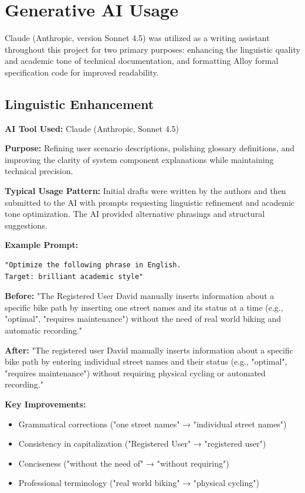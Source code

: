 \chapter{Generative AI Usage}
Claude (Anthropic, version Sonnet 4.5) was utilized as a writing assistant throughout this project for two primary purposes: enhancing the linguistic quality and academic tone of technical documentation, and formatting Alloy formal specification code for improved readability.

\section{Linguistic Enhancement}

\textbf{AI Tool Used:} Claude (Anthropic, Sonnet 4.5)

\textbf{Purpose:} Refining user scenario descriptions, polishing glossary definitions, and improving the clarity of system component explanations while maintaining technical precision.

\textbf{Typical Usage Pattern:} Initial drafts were written by the authors and then submitted to the AI with prompts requesting linguistic refinement and academic tone optimization. The AI provided alternative phrasings and structural suggestions.

\textbf{Example Prompt:}
\begin{verbatim}
"Optimize the following phrase in English. 
Target: brilliant academic style"
\end{verbatim}

\textbf{Before:} "The Registered User David manually inserts information about a specific bike path by inserting one street names and its status at a time (e.g., "optimal", "requires maintenance") without the need of real world biking and automatic recording."

\textbf{After:} "The registered user David manually inserts information about a specific bike path by entering individual street names and their status (e.g., "optimal", "requires maintenance") without requiring physical cycling or automated recording."

\textbf{Key Improvements:}
\begin{itemize}
    \item Grammatical corrections ("one street names" → "individual street names")
    \item Consistency in capitalization ("Registered User" → "registered user")
    \item Conciseness ("without the need of" → "without requiring")
    \item Professional terminology ("real world biking" → "physical cycling")
\end{itemize}

